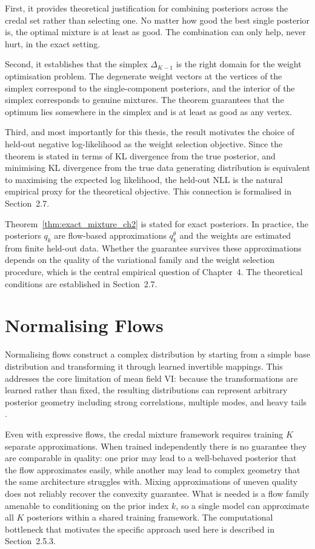     First, it provides theoretical justification for combining posteriors across the credal set rather than selecting one. No matter how good the best single posterior is, the optimal mixture is at least as good. The combination can only help, never hurt, in the exact setting.

    Second, it establishes that the simplex $\Delta_{K-1}$ is the right domain for the weight optimisation problem. The degenerate weight vectors at the vertices of the simplex correspond to the single-component posteriors, and the interior of the simplex corresponds to genuine mixtures. The theorem guarantees that the optimum lies somewhere in the simplex and is at least as good as any vertex.

    Third, and most importantly for this thesis, the result motivates the choice of held-out negative log-likelihood as the weight selection objective. Since the theorem is stated in terms of KL divergence from the true posterior, and minimising KL divergence from the true data generating distribution is equivalent to maximising the expected log likelihood, the held-out NLL is the natural empirical proxy for the theoretical objective. This connection is formalised in Section~2.7.

    \begin{remark}
    Theorem~\ref{thm:exact_mixture_ch2} is stated for exact posteriors. In practice, the posteriors $q_k$ are flow-based approximations $q^\theta_k$ and the weights are estimated from finite held-out data. Whether the guarantee survives these approximations depends on the quality of the variational family and the weight selection procedure, which is the central empirical question of Chapter~4. The theoretical conditions are established in Section~2.7.
    \end{remark}

\section{Normalising Flows}

    Normalising flows construct a complex distribution by starting from a simple base distribution and transforming it through learned invertible mappings. This addresses the core limitation of mean field VI: because the transformations are learned rather than fixed, the resulting distributions can represent arbitrary posterior geometry including strong correlations, multiple modes, and heavy tails \citep{papamakarios2021}.

    Even with expressive flows, the credal mixture framework requires training $K$ separate approximations. When trained independently there is no guarantee they are comparable in quality: one prior may lead to a well-behaved posterior that the flow approximates easily, while another may lead to complex geometry that the same architecture struggles with. Mixing approximations of uneven quality does not reliably recover the convexity guarantee. What is needed is a flow family amenable to conditioning on the prior index $k$, so a single model can approximate all $K$ posteriors within a shared training framework. The computational bottleneck that motivates the specific approach used here is described in Section~2.5.3.

